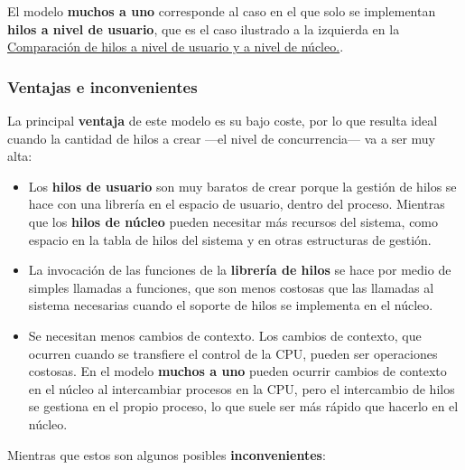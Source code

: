 El modelo \textbf{muchos a uno} corresponde al caso en el que solo se
implementan \textbf{hilos a nivel de usuario}, que es el caso ilustrado
a la izquierda en la
\hyperref[fig-comparaciuxf3n-soporte-de-hilos]{Comparación de hilos a
nivel de usuario y a nivel de núcleo.}.

\subsubsection{Ventajas e
inconvenientes}\label{_ventajas_e_inconvenientes}

La principal \textbf{ventaja} de este modelo es su bajo coste, por lo
que resulta ideal cuando la cantidad de hilos a crear ---el nivel de
concurrencia--- va a ser muy alta:

\begin{itemize}
\item
  Los \textbf{hilos de usuario} son muy baratos de crear porque la
  gestión de hilos se hace con una librería en el espacio de usuario,
  dentro del proceso. Mientras que los \textbf{hilos de núcleo} pueden
  necesitar más recursos del sistema, como espacio en la tabla de hilos
  del sistema y en otras estructuras de gestión.
\item
  La invocación de las funciones de la \textbf{librería de hilos} se
  hace por medio de simples llamadas a funciones, que son menos costosas
  que las llamadas al sistema necesarias cuando el soporte de hilos se
  implementa en el núcleo.
\item
  Se necesitan menos cambios de contexto. Los cambios de contexto, que
  ocurren cuando se transfiere el control de la CPU, pueden ser
  operaciones costosas. En el modelo \textbf{muchos a uno} pueden
  ocurrir cambios de contexto en el núcleo al intercambiar procesos en
  la CPU, pero el intercambio de hilos se gestiona en el propio proceso,
  lo que suele ser más rápido que hacerlo en el núcleo.
\end{itemize}

Mientras que estos son algunos posibles \textbf{inconvenientes}:

